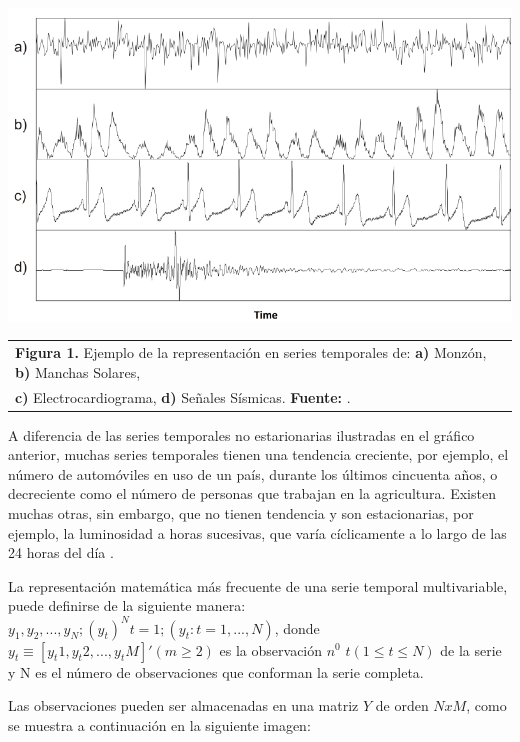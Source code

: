 \begin{center}
\includegraphics[scale=0.7]{timeSeries.png}
\vspace*{10pt}
\footnotesize{
\begin{tabular}{l}
\textbf{Figura 1.} Ejemplo de la representaci\'on en series temporales de: \textbf{a)} Monz\'on, \textbf{b)} Manchas Solares,\\ \textbf{c)} Electrocardiograma, \textbf{d)} Se\~nales S\'ismicas. \textbf{Fuente:} \cite{concepts}.
\end{tabular}}
\end{center}
A diferencia de las series temporales no estarionarias ilustradas en el gr\'afico anterior, muchas series temporales tienen una tendencia creciente, por ejemplo, el n\'umero de autom\'oviles en uso de un pa\'is, durante los \'ultimos cincuenta a\~nos, o decreciente como el n\'umero de personas que trabajan en la agricultura. Existen muchas otras, sin embargo, que no tienen tendencia y son estacionarias, por ejemplo, la luminosidad a horas sucesivas, que var\'ia c\'iclicamente a lo largo de las 24 horas del d\'ia \cite{concepts}.\par
La representaci\'on matem\'atica m\'as frecuente de una serie temporal multivariable, puede definirse de la siguiente manera:\\
$y_1, y_2,...,y_N; (y_t)^N t=1; (y_t: t=1,...,N)$, donde $y_t \equiv [y_t1, y_t2,...,y_tM]' (m \geq 2)$ es la observaci\'on $n^0$ $t(1 \leq t \leq N)$ de la serie y N es el n\'umero de observaciones que conforman la serie completa.\par
Las observaciones pueden ser almacenadas en una matriz $Y$ de orden $N x M$, como se muestra a continuaci\'on en la siguiente imagen:\\
